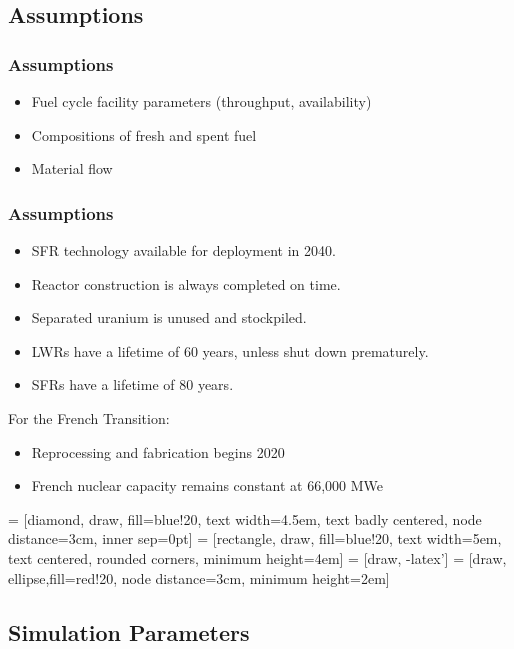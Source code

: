     \subsection{Assumptions}

\begin{frame}
    \frametitle{Assumptions}
    \begin{itemize}
        \item Fuel cycle facility parameters (throughput, availability)
        \item Compositions of fresh and spent fuel
        \item Material flow
    \end{itemize}
\end{frame}

\begin{frame}
    \frametitle{Assumptions}
    \begin{itemize}
        \item SFR technology available for deployment in 2040.
        \item Reactor construction is always completed on time.
        \item Separated uranium is unused and stockpiled.
        \item LWRs have a lifetime of 60 years, unless shut down prematurely.
        \item SFRs have a lifetime of 80 years.
    \end{itemize}
    For the French Transition:
    \begin{itemize}
        \item Reprocessing and fabrication begins 2020
        \item French nuclear capacity remains constant at 66,000 MWe
    \end{itemize}
\end{frame}


 = [diamond, draw, fill=blue!20, 
text width=4.5em, text badly centered, node distance=3cm, inner sep=0pt]
 = [rectangle, draw, fill=blue!20, 
text width=5em, text centered, rounded corners, minimum height=4em]
 = [draw, -latex']
 = [draw, ellipse,fill=red!20, node distance=3cm,
minimum height=2em]

\subsection{Simulation Parameters}

